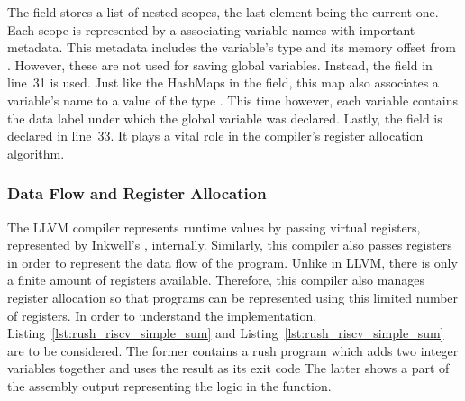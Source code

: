 The  field stores a list of nested scopes, the last element being the current one.
Each scope is represented by a  associating variable names with important metadata.
This metadata includes the variable's type and its memory offset from .
However, these  are not used for saving global variables.
Instead, the  field in line~31 is used.
Just like the HashMaps in the  field, this map also associates a variable's name to a value of the type .
This time however, each variable contains the data label under which the global variable was declared.
Lastly, the  field is declared in line~33.
It plays a vital role in the compiler's register allocation algorithm.

\subsubsection{Data Flow and Register Allocation}

The LLVM compiler represents runtime values by passing virtual registers, represented by Inkwell's , internally.
Similarly, this compiler also passes registers in order to represent the data flow of the program.
Unlike in LLVM, there is only a finite amount of registers available.
Therefore, this compiler also manages register allocation so that programs can be represented using this limited number of registers.
In order to understand the implementation, Listing~\ref{lst:rush_riscv_simple_sum} and Listing~\ref{lst:rush_riscv_simple_sum} are to be considered.
The former contains a rush program which adds two integer variables together and uses the result as its exit code
The latter shows a part of the assembly output representing the logic in the  function.

\begin{minipage}{.45\textwidth}
	\center
\end{minipage}%
\hfill%
\begin{minipage}{.45\textwidth}
	\center
	\vspace{.1cm}
\end{minipage}

